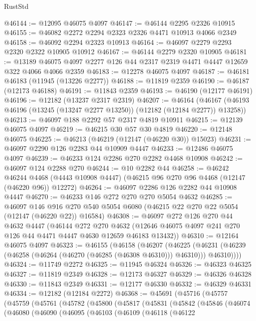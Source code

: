 \begin{lexlean}{RustStd}
\begin{coremodule}
@46144 := @12095 @46075 @4097
@46147 := @46144 @2295 @2326 @10915
@46155 := @46082 @2272 @2294 @2323 @2326 @4471 @10913 @4066 @2349
@46158 := @46092 @2294 @2323 @10913
@46164 := @46097 @2279 @2293 @2320 @2322 @10905 @10912
@46167 := @46144 @2279 @2320 @10905
@46181 := @13189 @46075 @4097 @2277 @126 @44 @2317 @2319 @4471 @4447 @12659 @322 @4066 @4066 @2359
@46183 := @12278 @46075 @4097
@46187 := @46181 @46183 (@11945 (@13226 @2277))
@46188 := @11819 @2359
@46190 := @46187 (@12173 @46188)
@46191 := @11843 @2359
@46193 := @46190 (@12177 @46191)
@46196 := @12182 (@13237 @2317 @2319)
@46207 := @46164
    (@46167 (@46193 @46196 (@13245 (@13247 @2277 @13250)) (@12182 (@12184 @2277)) @13258))
@46213 := @46097 @188 @2292 @57 @2317 @4819 @10911
@46215 := @12139 @46075 @4097
@46219 := @46215 @30 @57 @30 @4819
@46220 := @12148 @46075
@46225 := @46213 (@46219 (@12147 (@46220 @30)) @15023)
@46231 := @46097 @2290 @126 @2283 @44 @10909 @4447
@46233 := @12486 @46075 @4097
@46239 := @46233 @124 @2286 @270 @2282 @4468 @10908
@46242 := @46097 @124 @2288 @270
@46244 := @10 @2282 @44
@46258 := @46242
    @46244
    @4468
    (@4443 @10908 @4447)
    (@46215 @96 @270 @96 @4468 (@12147 (@46220 @96)) @12272)
@46264 := @46097 @2286 @126 @2282 @44 @10908 @4447
@46270 := @46233 @146 @272 @270 @270 @5054 @4632
@46285 := @46097
    @146
    @916
    @270
    @540
    @5054
    @6080
    (@46215 @22 @270 @22 @5054 (@12147 (@46220 @22)) @16584)
@46308 := @46097
    @272
    @126
    @270
    @44
    @4632
    @4447
    (@46144
      @272
      @270
      @4632
      (@12646 @46075 @4097 @241 @270 @126 @44 @4471 @4447 @4630 @12659 @46183 @13432))
@46310 := @12164 @46075 @4097
@46323 := @46155
    (@46158
      (@46207
        (@46225
          (@46231 (@46239 (@46258 (@46264 (@46270 (@46285 (@46308 @46310))) @46310))) @46310))))
@46324 := @11749 @2272
@46325 := @11945 @46324
@46326 := @46323 @46325
@46327 := @11819 @2349
@46328 := @12173 @46327
@46329 := @46326 @46328
@46330 := @11843 @2349
@46331 := @12177 @46330
@46332 := @46329 @46331
@46334 := @12182 (@12184 @2272)
@46368 := @45691
    (@45716
      (@45757
        (@45759
          (@45761
            (@45782
              (@45800
                (@45817
                  (@45831
                    (@45842
                      (@45846
                        (@46074
                          (@46080
                            (@46090
                              (@46095
                                (@46103
                                  (@46109
                                    (@46118
                                      (@46122

\end{coremodule}
\end{lexlean}
